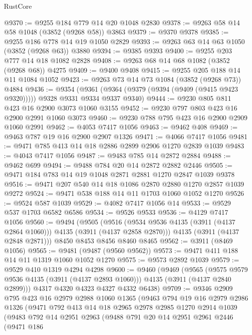 \begin{lexlean}{RustCore}
\begin{coremodule}
@9370 := @9255 @184 @779 @14 @20 @1048 @2830
@9378 := @9263 @58 @14 @58 @1048 (@3852 (@9268 @58)) @3863
@9379 := @9370 @9378
@9385 := @9255 @186 @778 @14 @19 @1050 @2829
@9393 := @9263 @63 @14 @63 @1050 (@3852 (@9268 @63)) @3880
@9394 := @9385 @9393
@9400 := @9255 @203 @777 @14 @18 @1082 @2828
@9408 := @9263 @68 @14 @68 @1082 (@3852 (@9268 @68)) @4275
@9409 := @9400 @9408
@9415 := @9255 @205 @188 @14 @11 @1084 @1052
@9423 := @9263 @73 @14 @73 @1084 (@3852 (@9268 @73)) @4884
@9436 := @9354
    (@9361 (@9364 (@9379 (@9394 (@9409 (@9415 @9423 @9320))))) @9328 @9331 @9334 @9337 @9340)
@9444 := @9230 @805 @811 @423 @16 @2900 @3073 @1060 @3155
@9452 := @9230 @797 @803 @423 @16 @2900 @2991 @1060 @3073
@9460 := @9230 @788 @795 @423 @16 @2900 @2909 @1060 @2991
@9462 := @4053 @7417 @1056
@9463 := @9462 @408
@9469 := @9463 @787 @19 @16 @2900 @2907 @1326
@9471 := @4066 @7417 @1056
@9481 := @9471 @785 @413 @14 @18 @2886 @2899 @2906 @1270 @2839 @1039
@9483 := @4043 @7417 @1056
@9487 := @9483 @785 @14 @2872 @2884
@9488 := @9462 @699
@9494 := @9488 @784 @20 @14 @2872 @2882 @2446
@9505 := @9471 @184 @783 @14 @19 @1048 @2871 @2881 @1270 @2847 @1039 @9378
@9516 := @9471 @207 @540 @14 @18 @1086 @2870 @2880 @1270 @2857 @1039 @9272
@9524 := @9471 @538 @188 @14 @11 @1703 @1060 @1052 @1270
@9526 := @9524 @587 @1039
@9529 := @4082 @7417 @1056 @14
@9533 := @9529 @537 @1703 @6582 @6586
@9534 := @9526 @9533
@9536 := @4129 @7417 @1056
@9560 := @9494
    (@9505
      (@9516 (@9534 @9536 @4135 (@3911 (@4137 @2864 @1060))) @4135 (@3911 (@4137 @2858 @2870)))
      @4135
      (@3911 (@4137 @2848 @2871)))
    @8450
    @8453
    @8456
    @8460
    @8465
@9562 := @3911 (@8469 @1056)
@9565 := @9481 (@9487 (@9560 @9562))
@9573 := @9471 @411 @188 @14 @11 @1319 @1060 @1052 @1270
@9575 := @9573 @2892 @1039
@9579 := @9529 @410 @1319 @4294 @4298
@9600 := @9460
    (@9469
      (@9565
        (@9575 @9579 @9536 @4135 (@3911 (@4137 @2893 @1060)))
        @4135
        (@3911 (@4137 @2840 @2899)))
      @4317
      @4320
      @4323
      @4327
      @4332
      @6438)
@9709 := @9346
    @2909
    @795
    @423
    @16
    @2979
    @2988
    @1060
    @1365
    (@9463
      @794
      @19
      @16
      @2979
      @2986
      @1326
      (@9471
        @792
        @413
        @14
        @18
        @2965
        @2978
        @2985
        @1270
        @2914
        @1039
        (@9483
          @792
          @14
          @2951
          @2963
          (@9488
            @791
            @20
            @14
            @2951
            @2961
            @2446
            (@9471
              @186

\end{coremodule}
\end{lexlean}
